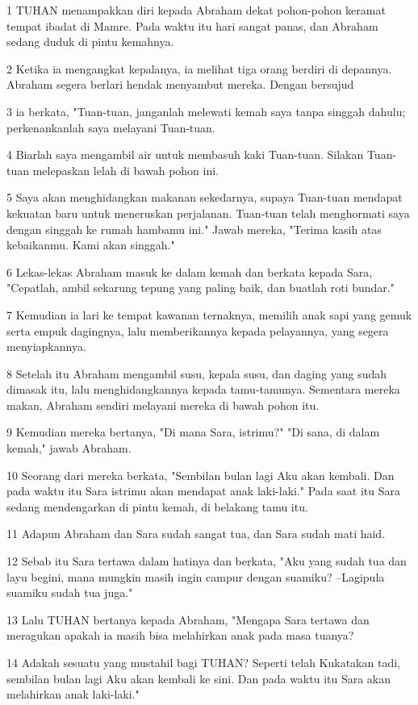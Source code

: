 \par 1 TUHAN menampakkan diri kepada Abraham dekat pohon-pohon keramat tempat ibadat di Mamre. Pada waktu itu hari sangat panas, dan Abraham sedang duduk di pintu kemahnya.
\par 2 Ketika ia mengangkat kepalanya, ia melihat tiga orang berdiri di depannya. Abraham segera berlari hendak menyambut mereka. Dengan bersujud
\par 3 ia berkata, "Tuan-tuan, janganlah melewati kemah saya tanpa singgah dahulu; perkenankanlah saya melayani Tuan-tuan.
\par 4 Biarlah saya mengambil air untuk membasuh kaki Tuan-tuan. Silakan Tuan-tuan melepaskan lelah di bawah pohon ini.
\par 5 Saya akan menghidangkan makanan sekedarnya, supaya Tuan-tuan mendapat kekuatan baru untuk meneruskan perjalanan. Tuan-tuan telah menghormati saya dengan singgah ke rumah hambamu ini." Jawab mereka, "Terima kasih atas kebaikanmu. Kami akan singgah."
\par 6 Lekas-lekas Abraham masuk ke dalam kemah dan berkata kepada Sara, "Cepatlah, ambil sekarung tepung yang paling baik, dan buatlah roti bundar."
\par 7 Kemudian ia lari ke tempat kawanan ternaknya, memilih anak sapi yang gemuk serta empuk dagingnya, lalu memberikannya kepada pelayannya, yang segera menyiapkannya.
\par 8 Setelah itu Abraham mengambil susu, kepala susu, dan daging yang sudah dimasak itu, lalu menghidangkannya kepada tamu-tamunya. Sementara mereka makan, Abraham sendiri melayani mereka di bawah pohon itu.
\par 9 Kemudian mereka bertanya, "Di mana Sara, istrimu?" "Di sana, di dalam kemah," jawab Abraham.
\par 10 Seorang dari mereka berkata, "Sembilan bulan lagi Aku akan kembali. Dan pada waktu itu Sara istrimu akan mendapat anak laki-laki." Pada saat itu Sara sedang mendengarkan di pintu kemah, di belakang tamu itu.
\par 11 Adapun Abraham dan Sara sudah sangat tua, dan Sara sudah mati haid.
\par 12 Sebab itu Sara tertawa dalam hatinya dan berkata, "Aku yang sudah tua dan layu begini, mana mungkin masih ingin campur dengan suamiku? --Lagipula suamiku sudah tua juga."
\par 13 Lalu TUHAN bertanya kepada Abraham, "Mengapa Sara tertawa dan meragukan apakah ia masih bisa melahirkan anak pada masa tuanya?
\par 14 Adakah sesuatu yang mustahil bagi TUHAN? Seperti telah Kukatakan tadi, sembilan bulan lagi Aku akan kembali ke sini. Dan pada waktu itu Sara akan melahirkan anak laki-laki."

